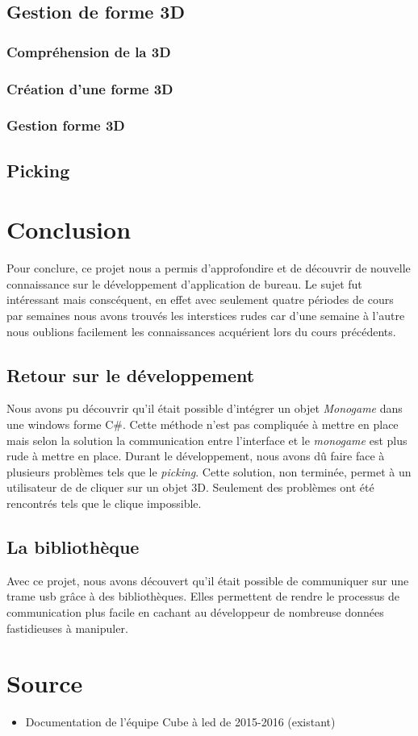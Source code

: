 \documentclass[a4paper,12pt]{article}
\begin{document}
\subsection{Gestion de forme 3D}

\subsubsection{Compréhension de la 3D}
\subsubsection{Création d'une forme 3D}
\subsubsection{Gestion forme 3D}
\subsection{Picking}
\newpage

\section{Conclusion}
Pour conclure, ce projet nous a permis d'approfondire et de découvrir de nouvelle connaissance sur le développement d'application de bureau. Le sujet fut intéressant mais conscéquent, en effet avec seulement quatre périodes de cours par semaines nous avons trouvés les interstices rudes car d'une semaine à l'autre nous oublions facilement les connaissances acquérient lors du cours précédents.

\subsection{Retour sur le développement}
Nous avons pu découvrir qu'il était possible d'intégrer un objet \emph{Monogame} dans une windows forme C\#. Cette méthode n'est pas compliquée à mettre en place mais selon la solution la communication entre l'interface et le \emph{monogame} est plus rude à mettre en place. Durant le développement, nous avons dû faire face à plusieurs problèmes tels que le \emph{picking}. Cette solution, non terminée, permet à un utilisateur de de cliquer sur un objet 3D. Seulement des problèmes ont été rencontrés tels que le clique impossible.

\subsection{La bibliothèque}
Avec ce projet, nous avons découvert qu'il était possible de communiquer sur une trame usb grâce à des bibliothèques. Elles permettent de rendre le processus de communication plus facile en cachant au développeur de nombreuse données fastidieuses à manipuler.
\newpage

\section{Source}
\begin{itemize}
	\item Documentation de l'équipe Cube à led de 2015-2016 (existant)
\end{itemize}

\newpage
\listoffigures
\end{document}
